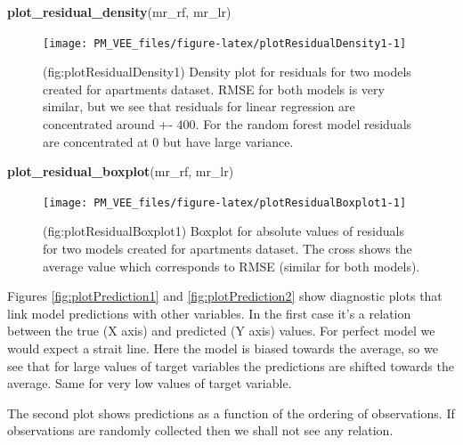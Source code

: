 \documentclass[12pt,]{krantz}
\newenvironment{Shaded}{\begin{snugshade}}{\end{snugshade}}
\newcommand{\KeywordTok}[1]{\textcolor[rgb]{0.13,0.29,0.53}{\textbf{#1}}}
\newcommand{\NormalTok}[1]{#1}
\begin{document}
\begin{Shaded}
\begin{Highlighting}[]
\KeywordTok{plot_residual_density}\NormalTok{(mr_rf, mr_lr)}
\end{Highlighting}
\end{Shaded}

\begin{figure}

{\centering \texttt{[image: PM\_VEE\_files/figure-latex/plotResidualDensity1-1]} 

}

\caption{(fig:plotResidualDensity1) Density plot for residuals for two models created for apartments dataset. RMSE for both models is very similar, but we see that residuals for linear regression are concentrated around +- 400. For the random forest model residuals are concentrated at 0 but have large variance.}\label{fig:plotResidualDensity1}
\end{figure}

\begin{Shaded}
\begin{Highlighting}[]
\KeywordTok{plot_residual_boxplot}\NormalTok{(mr_rf, mr_lr)}
\end{Highlighting}
\end{Shaded}

\begin{figure}

{\centering \texttt{[image: PM\_VEE\_files/figure-latex/plotResidualBoxplot1-1]} 

}

\caption{(fig:plotResidualBoxplot1) Boxplot for absolute values of residuals for two models created for apartments dataset. The cross shows the average value which corresponds to RMSE (similar for both models).}\label{fig:plotResidualBoxplot1}
\end{figure}

Figures \ref{fig:plotPrediction1} and \ref{fig:plotPrediction2} show diagnostic plots that link model predictions with other variables. In the first case it's a relation between the true (X axis) and predicted (Y axis) values. For perfect model we would expect a strait line. Here the model is biased towards the average, so we see that for large values of target variables the predictions are shifted towards the average. Same for very low values of target variable.

The second plot shows predictions as a function of the ordering of observations. If observations are randomly collected then we shall not see any relation.
\end{document}
